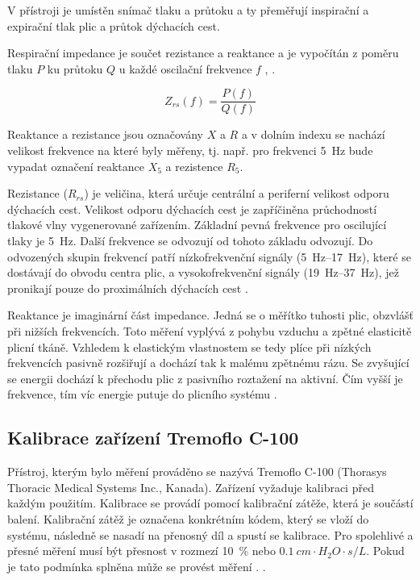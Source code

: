 V přístroji je umístěn snímač tlaku a průtoku a ty přeměřují inspirační a expirační tlak plic a průtok dýchacích cest. 

Respirační impedance je součet rezistance a reaktance a je vypočítán z poměru tlaku  $P$ ku průtoku $Q$ u každé oscilační frekvence $f$ \cite{Alamer2016}, \cite{Oostveen}.

\begin{equation}
	\label{rce:2}
	Z_{rs}(f) = \frac{P(f)}{Q(f)}
\end{equation}


Reaktance a rezistance jsou označovány $X$ a $R$ a v dolním indexu se nachází velikost frekvence na které byly měřeny, tj. např. pro frekvenci \SI{5}{Hz} bude vypadat označení reaktance $X_5$ a rezistence $R_5$. 


Rezistance ($R_{rs}$) je veličina, která určuje centrální a periferní velikost odporu dýchacích cest. Velikost odporu dýchacích cest je zapříčiněna průchodností tlakové vlny vygenerované zařízením. Základní pevná frekvence pro oscilující tlaky je 5~Hz. Další frekvence se odvozují od tohoto základu odvozují. Do odvozených skupin frekvencí patří nízkofrekvenční signály (\SI{5}{Hz}--\SI{17}{Hz}), které se dostávají do obvodu centra plic, a vysokofrekvenční signály (\SI{19}{Hz}--\SI{37}{Hz}), jež pronikají pouze do proximálních dýchacích cest \cite{Clement1987}. 

Reaktance je imaginární část impedance. Jedná se o měřítko tuhosti plic, obzvlášť při nižších frekvencích. Toto měření vyplývá z pohybu vzduchu  a zpětné elasticitě plicní tkáně. Vzhledem k elastickým vlastnostem se tedy plíce při nízkých frekvencích pasivně rozšiřují a dochází tak k malému zpětnému rázu. Se zvyšující se energii dochází k přechodu plic z pasivního roztažení na aktivní. Čím vyšší je frekvence, tím víc energie putuje do plicního systému  \cite{Oostveen}. 


\subsection{Kalibrace zařízení Tremoflo C-100}\label{kalibrace}
Přístroj, kterým bylo měření prováděno se nazývá Tremoflo C-100 (Thorasys Thoracic Medical Systems Inc., Kanada). Zařízení vyžaduje kalibraci před každým použitím. Kalibrace se provádí pomocí kalibrační zátěže, která je součástí balení. Kalibrační zátěž je označena konkrétním kódem, který se vloží do systému, následně  se nasadí na přenosný díl a spustí se kalibrace. Pro spolehlivé a přesné měření musí být přesnost 
v rozmezí \SI{10}{\%} nebo $\SI{0,1}{cm \cdot H_{2}O \cdot s/L}$. Pokud je tato podmínka splněna může se provést měření \cite{Vlcek2018}.
. 
